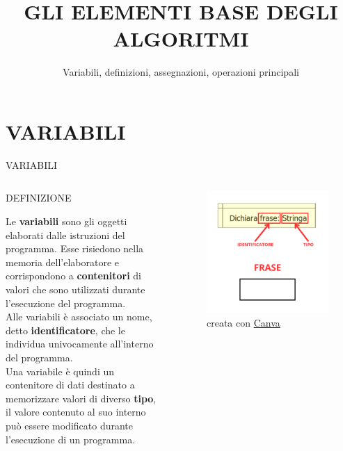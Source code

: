 \documentclass[aspectratio=1610, handout]{beamer}
\title{GLI ELEMENTI BASE DEGLI ALGORITMI}
\subtitle{Variabili, definizioni, assegnazioni, operazioni principali}
\date{}
\institute{\textit{
        Fonti:
        \begin{itemize}
            \item[-] \href{http://www.flowgorithm.org/documentation}{Documentazione Flowgorithm}
            \item[-] \href{https://catalogo.sanoma.it/si-op-104157-dal-bit-all-intelligenza-artificiale.html\#bundles.tab}{Dal Bit all'Intelligenza Artificiale}
        \end{itemize}
    }
}
\begin{document}
\begin{frame}
    \titlepage
\end{frame}

\section{VARIABILI}

\begin{frame}{VARIABILI}
    \begin{columns}
            \begin{alertblock}{DEFINIZIONE}
                \begin{minipage}{0.96\linewidth}
                    \justifying
                    Le \textbf{variabili} sono gli oggetti elaborati dalle istruzioni del programma. 
                    Esse risiedono nella memoria dell'elaboratore e corrispondono a \textbf{contenitori} di 
                    valori che sono utilizzati durante l'esecuzione del programma.\\
                    Alle variabili è associato un nome, detto \textbf{identificatore}, che le individua 
                    univocamente all'interno del programma. \\
                    Una variabile è quindi un contenitore di dati destinato a memorizzare valori di diverso 
                    \textbf{tipo}, il valore contenuto al suo interno può essere modificato durante l'esecuzione 
                    di un programma.
                \end{minipage}
            \end{alertblock}
            \begin{figure}
                \includegraphics[width=\linewidth]{img/variabile.png}
                \caption{{creata con \href{www.canva.com}{Canva}}}
            \end{figure}
    \end{columns}
\end{frame}
\end{document}
